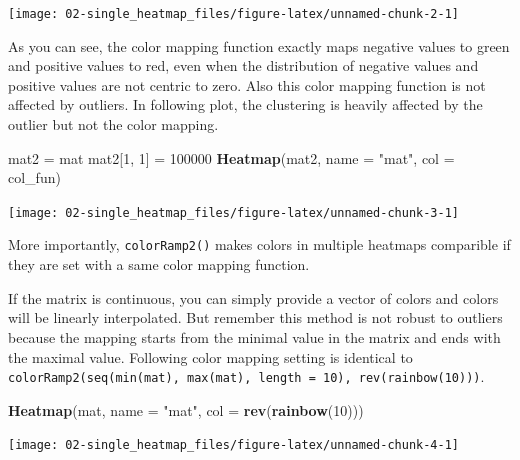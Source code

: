\documentclass[]{book}
\newenvironment{Shaded}{\begin{snugshade}}{\end{snugshade}}
\newcommand{\KeywordTok}[1]{\textcolor[rgb]{0.13,0.29,0.53}{\textbf{#1}}}
\newcommand{\DataTypeTok}[1]{\textcolor[rgb]{0.13,0.29,0.53}{#1}}
\newcommand{\DecValTok}[1]{\textcolor[rgb]{0.00,0.00,0.81}{#1}}
\newcommand{\StringTok}[1]{\textcolor[rgb]{0.31,0.60,0.02}{#1}}
\newcommand{\NormalTok}[1]{#1}
\theoremstyle{definition}
\theoremstyle{definition}
\theoremstyle{definition}
\theoremstyle{remark}
\begin{document}
\begin{center}\texttt{[image: 02-single\_heatmap\_files/figure-latex/unnamed-chunk-2-1]} \end{center}

As you can see, the color mapping function exactly maps negative values
to green and positive values to red, even when the distribution of
negative values and positive values are not centric to zero. Also this
color mapping function is not affected by outliers. In following plot,
the clustering is heavily affected by the outlier but not the color
mapping.

\begin{Shaded}
\begin{Highlighting}[]
\NormalTok{mat2 =}\StringTok{ }\NormalTok{mat}
\NormalTok{mat2[}\DecValTok{1}\NormalTok{, }\DecValTok{1}\NormalTok{] =}\StringTok{ }\DecValTok{100000}
\KeywordTok{Heatmap}\NormalTok{(mat2, }\DataTypeTok{name =} \StringTok{"mat"}\NormalTok{, }\DataTypeTok{col =}\NormalTok{ col_fun)}
\end{Highlighting}
\end{Shaded}

\begin{center}\texttt{[image: 02-single\_heatmap\_files/figure-latex/unnamed-chunk-3-1]} \end{center}

More importantly, \texttt{colorRamp2()} makes colors in multiple
heatmaps comparible if they are set with a same color mapping function.

If the matrix is continuous, you can simply provide a vector of colors
and colors will be linearly interpolated. But remember this method is
not robust to outliers because the mapping starts from the minimal value
in the matrix and ends with the maximal value. Following color mapping
setting is identical to
\texttt{colorRamp2(seq(min(mat),\ max(mat),\ length\ =\ 10),\ rev(rainbow(10)))}.

\begin{Shaded}
\begin{Highlighting}[]
\KeywordTok{Heatmap}\NormalTok{(mat, }\DataTypeTok{name =} \StringTok{"mat"}\NormalTok{, }\DataTypeTok{col =} \KeywordTok{rev}\NormalTok{(}\KeywordTok{rainbow}\NormalTok{(}\DecValTok{10}\NormalTok{)))}
\end{Highlighting}
\end{Shaded}

\begin{center}\texttt{[image: 02-single\_heatmap\_files/figure-latex/unnamed-chunk-4-1]} \end{center}
\end{document}
